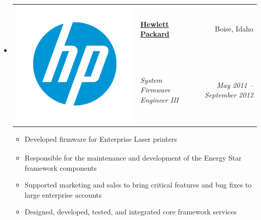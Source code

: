 \documentclass[letterpaper,11pt]{article}
\makeatletter
\newcommand{\resitem}[1]{\item #1 \vspace{-2pt}}
\newcommand{\ressubheadingG}[5]{
\item[]
	\begin{tabular*}{6.5in}{l@{\hspace{.1in}} l@{\extracolsep{\fill}}r}
		\multirow{2}{1in}{#1} & \textbf{#2} & #3 \\
		& \textit{#4} & \textit{#5} \\
         \end{tabular*}
	 \vspace{-6pt}}
\makeatother
\begin{document}
\begin{itemize}
  \ressubheadingG
    {\includegraphics[scale=.05]{hp.png}}
    {{\href{https://hp.com}{Hewlett Packard}}}
    {Boise, Idaho}
    {System Firmware Engineer III}
    {May 2011 -- September 2012}
    { \footnotesize
    \begin{itemize}
      \resitem{Developed firmware for Enterprise Laser printers}
      \resitem{Responsible for the maintenance and development of the Energy
          Star\textsuperscript{\textregistered}  framework components}
      \resitem{Supported marketing and sales to bring critical features
               and bug fixes to large enterprise accounts}
      \resitem{Designed, developed, tested, and integrated core framework services}
    \end{itemize}
  }


\end{itemize}
\end{document}
